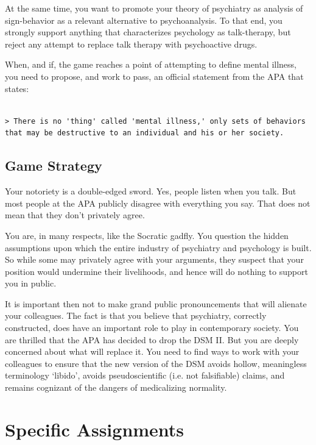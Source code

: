 At the same time, you want to promote your theory of psychiatry as analysis of sign-behavior as a relevant alternative to psychoanalysis. To that end, you strongly support anything that characterizes psychology as talk-therapy, but reject any attempt to replace talk therapy with psychoactive drugs.

When, and if, the game reaches a point of attempting to define mental illness, you need to propose, and work to pass, an official statement from the APA that states:

\begin{adjustwidth}{2.5em}{2.5em}
\begin{verbatim}

> There is no 'thing' called 'mental illness,' only sets of behaviors that may be destructive to an individual and his or her society.

\end{verbatim}
\end{adjustwidth}

\subsection{Game Strategy}
\label{gamestrategy}

Your notoriety is a double-edged sword. Yes, people listen when you talk. But most people at the APA publicly disagree with everything you say. That does not mean that they don't privately agree.

You are, in many respects, like the Socratic gadfly. You question the hidden assumptions upon which the entire industry of psychiatry and psychology is built. So while some may privately agree with your arguments, they suspect that your position would undermine their livelihoods, and hence will do nothing to support you in public.

It is important then not to make grand public pronouncements that will alienate your colleagues. The fact is that you believe that psychiatry, correctly constructed, does have an important role to play in contemporary society. You are thrilled that the APA has decided to drop the DSM II. But you are deeply concerned about what will replace it. You need to find ways to work with your colleagues to ensure that the new version of the DSM avoids hollow, meaningless terminology `libido', avoids pseudoscientific (i.e. not falsifiable) claims, and remains cognizant of the dangers of medicalizing normality.

\section{Specific Assignments}
\label{specificassignments}

